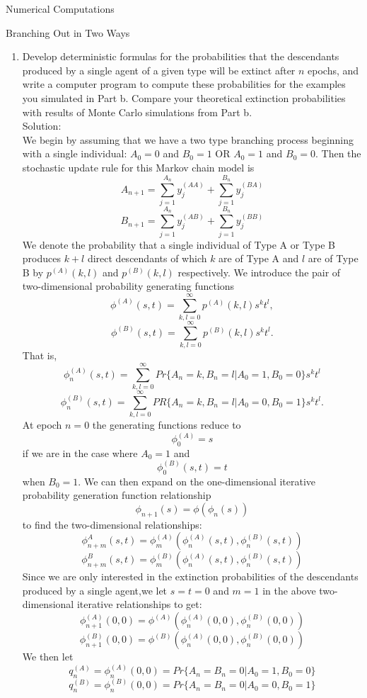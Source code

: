 \documentclass[12pt]{article}
\numberwithin{equation}{section}
\begin{document}
\begin{section}{Numerical Computations}
\begin{subsection}{Branching Out in Two Ways}
\begin{enumerate}
    \item Develop deterministic formulas for the probabilities that the descendants produced by a single agent of a given type will be extinct after $n$ epochs, and write a computer program to compute these probabilities for the examples you simulated in Part b. Compare your theoretical extinction probabilities with results of Monte Carlo simulations from Part b.\\

        Solution:\\

        We begin by assuming that we have a two type branching process beginning with a single individual: $A_0=0$ and $B_0=1$ OR $A_0=1$ and $B_0=0$. Then the stochastic update rule for this Markov chain model is
        $$A_{n+1}=\sum_{j=1}^{A_n}y_j^{(AA)}+\sum_{j=1}^{B_n}y_j^{(BA)}$$
        $$B_{n+1}=\sum_{j=1}^{A_n}y_j^{(AB)}+\sum_{j=1}^{B_n}y_j^{(BB)}$$
        We denote the probability that a single individual of Type A or Type B produces $k+l$ direct descendants of which $k$ are of Type A and $l$ are of Type B by $p^{(A)}(k,l)$ and $p^{(B)}(k,l)$ respectively. We introduce the pair of two-dimensional probability generating functions
        $$\phi^{(A)}(s,t)=\sum_{k,l=0}^\infty p^{(A)}(k,l)s^kt^l,$$
        $$\phi^{(B)}(s,t)=\sum_{k,l=0}^\infty p^{(B)}(k,l)s^kt^l.$$
        That is,
        $$\phi_n^{(A)}(s,t)=\sum_{k,l=0}^\infty Pr\{A_n=k,B_n=l|A_0=1,B_0=0\}s^kt^l$$
        $$\phi_n^{(B)}(s,t)=\sum_{k,l=0}^\infty PR\{A_n=k,B_n=l|A_0=0,B_0=1\}s^kt^l.$$
        At epoch $n=0$ the generating functions reduce to
        $$\phi_0^{(A)}=s$$
        if we are in the case where $A_0=1$ and
        $$\phi_0^{(B)}(s,t)=t$$
        when $B_0=1$.
        We can then expand on the one-dimensional iterative probability generation function relationship
        $$\phi_{n+1}(s)=\phi(\phi_n(s))$$
        to find the two-dimensional relationships:
        $$\phi^{A}_{n+m}(s,t)=\phi_m^{(A)}(\phi^{(A)}_n(s,t),\phi^{(B)}_n(s,t))$$
        $$\phi^{B}_{n+m}(s,t)=\phi_m^{(B)}(\phi^{(A)}_n(s,t),\phi^{(B)}_n(s,t))$$
        Since we are only interested in the extinction probabilities of the descendants produced by a single agent,we let $s=t=0$ and $m=1$ in the above two-dimensional iterative relationships to get:
        $$\phi_{n+1}^{(A)}(0,0)=\phi^{(A)}(\phi_n^{(A)}(0,0),\phi_n^{(B)}(0,0))$$
        $$\phi_{n+1}^{(B)}(0,0)=\phi^{(B)}(\phi_n^{(A)}(0,0),\phi_n^{(B)}(0,0))$$
        We then let
        $$q_n^{(A)}=\phi_n^{(A)}(0,0)=Pr\{A_n=B_n=0|A_0=1,B_0=0\}$$
        $$q_n^{(B)}=\phi_n^{(B)}(0,0)=Pr\{A_n=B_n=0|A_0=0,B_0=1\}$$

\end{enumerate}
\end{subsection}
\end{section}
\end{document}
